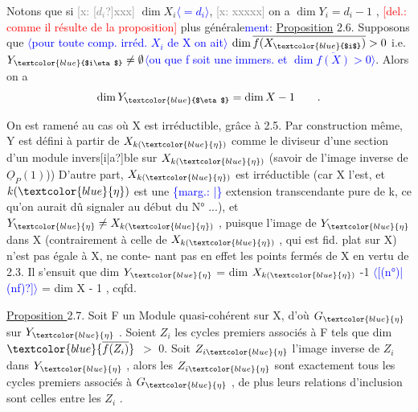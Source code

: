 \documentclass[11pt]{article}
\newcommand{\scanpage}[1]{\par\bigskip\noindent{\small\sffamily[scan #1]}\par}
\newcommand{\mspage}[1]{{\small\sffamily[p.\,#1]}}
\newcommand{\hand}[1]{\textcolor{blue}{#1}}
\newcommand{\inserted}[2][]{\textcolor{blue}{$\langle$#2$\rangle$}}
\newcommand{\margin}[1]{\textcolor{blue}{\{\textsf{marg.:} #1\}}}
\newcommand{\deleted}[1]{\textcolor{red}{[\textsf{del.:} #1]}}
\newcommand{\xout}[1]{\textcolor{gray}{[\textsf{x:} #1]}}
\newcommand{\uline}[1]{\underline{#1}}
\newcommand{\unsure}[1]{[#1?]}
\begin{document}
Notons que si \xout{\unsure{$d_i$}xxx} $\dim X_i$\inserted[typed]{$= d_i$}, \xout{xxxxx} on a $\dim Y_i = d_i-1$ , \deleted{comme
il résulte de la proposition} plus générale\hand{ment}:
\uline{Proposition} 2.6. Supposons que \inserted{pour toute comp. irréd. $X_i$ de X on ait} $\dim \overline{f(X_{\hand{$i$}})} > 0$ i.e. $Y_{\hand{$i\eta$}} \neq \emptyset$\inserted{ou que f soit une immers. et $\dim \overline{f(X)}>0$}. Alors on a
\[ \dim Y_{\hand{$\eta$}} = \dim X - 1 \qquad . \]

\mspage{9}

\clearpage
\scanpage{25/10}
\mspage{7}

On est ramené au cas où X est irréductible, grâce à 2.5. Par construction
même, Y est défini à partir de $X_{k(\hand{\eta})}$ comme le diviseur d'une section
d'un module invers\unsure{i|a}ble sur $X_{k(\hand{\eta})}$ (savoir de l'image inverse de $\underline{O}_P(1)$))
D'autre part, $X_{k(\hand{\eta})}$ est irréductible (car X l'est, et $k(\hand{\eta})$ est une
\margin{|} extension transcendante pure de k, ce qu'on aurait dû signaler au début du
N° ...), et $Y_{\hand{\eta}} \neq X_{k(\hand{\eta})}$ , puisque l'image de $Y_{\hand{\eta}}$ dans X (contrairement
à celle de $X_{k(\hand{\eta})}$ , qui est fid. plat sur X) n'est pas égale à X, ne conte-%
nant pas en effet les points fermés de X en vertu de 2.3. Il s'ensuit que
dim $Y_{\hand{\eta}}$ = dim $X_{k(\hand{\eta})}$ -1 \inserted{\unsure{(n°)|(nf)}} = dim X - 1 , cqfd.

\uline{Proposition }2.7. Soit F un Module quasi-cohérent sur X, d'où $G_{\hand{\eta}}$ sur $Y_{\hand{\eta}}$ .
Soient $Z_i$ les cycles premiers associés à F tels que dim $\hand{\overline{f(Z_i)}}$ $>$ 0. Soit
$Z_{i\hand{\eta}}$ l'image inverse de $Z_i$ dans $Y_{\hand{\eta}}$ , alors les $Z_{i\hand{\eta}}$ sont exactement tous
les cycles premiers associés à $G_{\hand{\eta}}$ , de plus leurs relations d'inclusion
sont celles entre les $Z_i$ .
\end{document}
